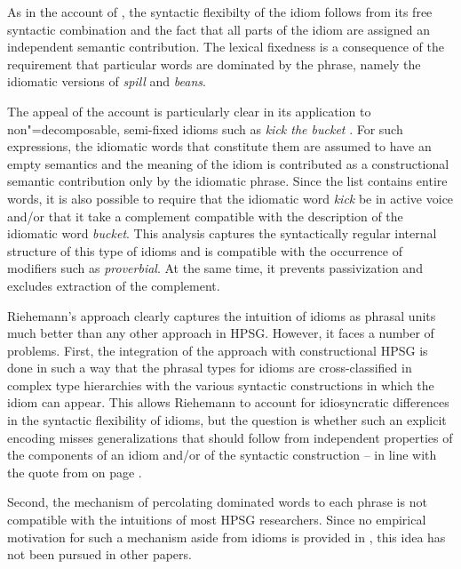\documentclass[output=paper
                ,modfonts
                ,nonflat
	        ,collection
	        ,collectionchapter
	        ,collectiontoclongg
 	        ,biblatex
                ,babelshorthands
                ,newtxmath
                ,draftmode
                ,colorlinks, citecolor=brown
]{./langsci/langscibook}
\begin{document}
As in the account of \citet{KE94a}, the syntactic flexibilty of the idiom follows from its free syntactic combination and the fact that all parts of the idiom are assigned an independent semantic contribution. The lexical fixedness is a consequence of the requirement that particular words are dominated by the phrase, namely the idiomatic versions of \emph{spill} and \emph{beans}.

The appeal of the account is particularly clear in its application to non"=de\-com\-posable, semi-fixed idioms such as \emph{kick the bucket} \citep[]{Riehemann2001a}. 
For such expressions, the idiomatic words that constitute them are assumed to have an empty semantics and the meaning of the idiom is contributed as a constructional semantic contribution only by the idiomatic phrase. 
Since the  list contains entire words, it is also possible to require that the idiomatic word \emph{kick} be in active voice and/or that it take a complement compatible with the description of the idiomatic word \emph{bucket}.
This analysis captures the syntactically regular internal structure of this type of idioms and is compatible with the occurrence of modifiers such as \emph{proverbial}. At the same time, it prevents passivization and excludes extraction of the complement.

Riehemann's approach clearly captures the intuition of idioms as phrasal units much better than any other approach in HPSG. 
However, it faces a number of problems.
First, the integration of the approach with constructional HPSG is done in such a way that the phrasal types for idioms are cross-classified in complex type hierarchies with the various syntactic constructions in which the idiom can appear. 
This allows Riehemann to account for idiosyncratic differences in the syntactic flexibility of idioms, but the question is whether such an explicit encoding misses generalizations that should follow from independent properties of the components of an idiom and/or of the syntactic construction -- in line with the quote from \citet{NSW94a} on page \pageref{NSW-quote}.


Second, the mechanism of percolating dominated words to each phrase is not compatible with the intuitions of most HPSG researchers. 
Since no empirical motivation for such a mechanism aside from idioms is provided in \citet{Riehemann2001a}, this idea has not been pursued in other papers. 
\end{document}
